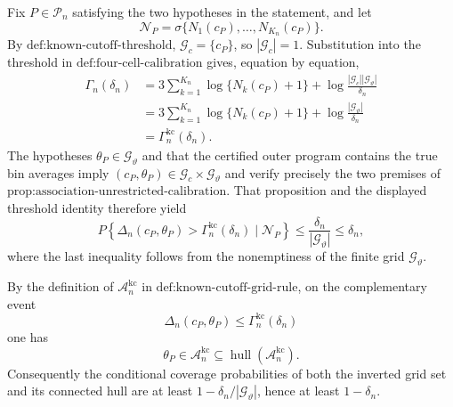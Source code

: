 Fix \(P\in\mathcal P_n\) satisfying the two hypotheses in the statement, and let
\[
\mathscr N_P=\sigma\{N_1(c_P),\ldots,N_{K_n}(c_P)\}.
\]
By \(\text{def:known-cutoff-threshold}\), \(\mathcal G_c=\{c_P\}\), so \(|\mathcal G_c|=1\).  Substitution into the threshold in \(\text{def:four-cell-calibration}\) gives, equation by equation,
\[
\begin{aligned}
\Gamma_n(\delta_n)
&=3\sum_{k=1}^{K_n}\log\{N_k(c_P)+1\}
  +\log\frac{|\mathcal G_c||\mathcal G_\vartheta|}{\delta_n}\\
&=3\sum_{k=1}^{K_n}\log\{N_k(c_P)+1\}
  +\log\frac{|\mathcal G_\vartheta|}{\delta_n}\\
&=\Gamma_n^{\mathrm{kc}}(\delta_n).
\end{aligned}
\]
The hypotheses \(\theta_P\in\mathcal G_\vartheta\) and that the certified outer program contains the true bin averages imply
\((c_P,\theta_P)\in\mathcal G_c\times\mathcal G_\vartheta\) and verify precisely the two premises of \(\text{prop:association-unrestricted-calibration}\).  That proposition and the displayed threshold identity therefore yield
\[
P\!\left\{\Delta_n(c_P,\theta_P)>\Gamma_n^{\mathrm{kc}}(\delta_n)\mid\mathscr N_P\right\}
\le \frac{\delta_n}{|\mathcal G_\vartheta|}
\le\delta_n,
\]
where the last inequality follows from the nonemptiness of the finite grid \(\mathcal G_\vartheta\).

By the definition of \(\mathcal A_n^{\mathrm{kc}}\) in \(\text{def:known-cutoff-grid-rule}\), on the complementary event
\[
\Delta_n(c_P,\theta_P)\le\Gamma_n^{\mathrm{kc}}(\delta_n)
\]
one has
\[
\theta_P\in\mathcal A_n^{\mathrm{kc}}
\subseteq\operatorname{hull}(\mathcal A_n^{\mathrm{kc}}).
\]
Consequently the conditional coverage probabilities of both the inverted grid set and its connected hull are at least \(1-\delta_n/|\mathcal G_\vartheta|\), hence at least \(1-\delta_n\).

